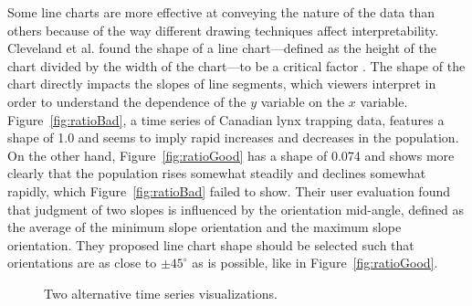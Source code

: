 Some line charts are more effective at conveying the nature of the data than others because of the way different drawing techniques affect interpretability.  Cleveland et al. found the shape of a line chart---defined as the height of the chart divided by the width of the chart---to be a critical factor \citeyearpar{cleveland1988}.   The shape of the chart directly impacts the slopes of line segments, which viewers interpret in order to understand the dependence of the $y$ variable on the $x$ variable.  Figure~\ref{fig:ratioBad}, a time series of Canadian lynx trapping data, features a shape of 1.0 and seems to imply rapid increases and decreases in the population.  On the other hand, Figure~\ref{fig:ratioGood} has a shape of 0.074 and shows more clearly that the population rises somewhat steadily and declines somewhat rapidly, which Figure~\ref{fig:ratioBad} failed to show.  Their user evaluation found that judgment of two slopes is influenced by the orientation mid-angle, defined as the average of the minimum slope orientation and the maximum slope orientation.  They proposed line chart shape should be selected such that orientations are as close to $\pm 45 ^{\circ}$ as is possible, like in Figure~\ref{fig:ratioGood}.

\begin{figure}
\centering


	\caption[Two alternative time series visualizations]{Two alternative time series visualizations.}
	\label{fig:tsAlternatives}
\end{figure}

